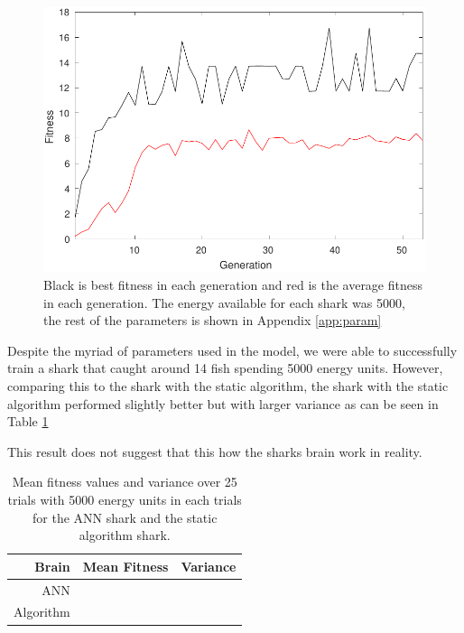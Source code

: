 \begin{figure}
\centering
\includegraphics[width=.7\textwidth]{figs/fitness.pdf}
\caption{\label{fig:fitness} Black is best fitness in each generation and red is the average fitness in each generation. The energy available for each shark was 5000, the rest of the parameters is shown in Appendix \ref{app:param}}
\end{figure}

Despite the myriad of parameters used in the model, we were able to successfully train a shark that caught around 14 fish spending 5000 energy units. However, comparing this to the shark with the static algorithm, the shark with the static algorithm performed slightly better but with larger variance as can be seen in Table \ref{tab:fitness} 

This result does not suggest that this how the sharks brain work in reality.
\begin{table}
\centering
\begin{tabular}{r|c|c} 
Brain & Mean Fitness & Variance \\ \hline
ANN   &              &          \\ \hline
Algorithm &          &          \\ \hline
\end{tabular} 
\caption{\label{tab:fitness} Mean fitness values and variance over 25 trials with 5000 energy units in each trials for the ANN shark and the static algorithm shark.}
\end{table}
